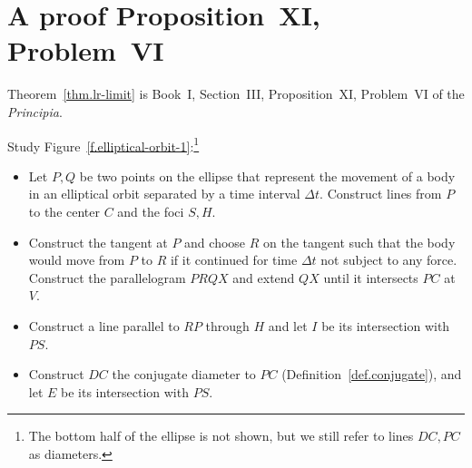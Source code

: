 

\section{A proof Proposition~XI, Problem~VI}
\label{s.centripetal}

Theorem~\ref{thm.lr-limit} is Book~I, Section~III, Proposition~XI, Problem~VI of the \emph{Principia}.

Study Figure~\ref{f.elliptical-orbit-1}:\footnote{The bottom half of the ellipse is not shown, but we still refer to lines $DC,PC$ as diameters.}
\begin{itemize}
\item Let $P,Q$ be two points on the ellipse that represent the movement of a body in an elliptical orbit separated by a time interval $\Delta t$. Construct lines from $P$ to the center $C$ and the foci $S,H$.

\item Construct the tangent at $P$ and choose $R$ on the tangent such that the body would move from $P$ to $R$ if it continued for time $\Delta t$ not subject to any force. Construct the parallelogram $PRQX$ and extend $QX$ until it intersects $PC$ at $V$.

\item Construct a line parallel to $RP$ through $H$ and let $I$ be its intersection with $PS$. 

\item Construct $DC$ the conjugate diameter to $PC$ (Definition~\ref{def.conjugate}), and let $E$ be its intersection with $PS$.
\end{itemize}


